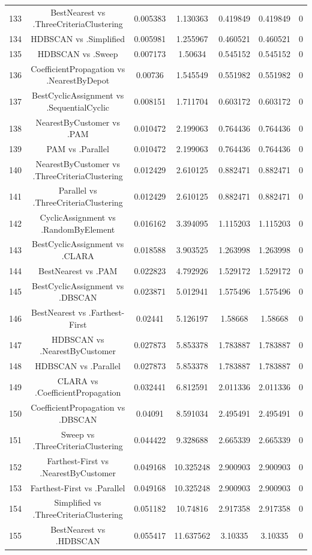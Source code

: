 \documentclass[a4paper,10pt]{article}
\begin{document}
\begin{landscape}
\begin{table}[!htp]
\begin{tabular}{ccccccc}
133&BestNearest vs .ThreeCriteriaClustering&0.005383&1.130363&0.419849&0.419849&0\\
134&HDBSCAN vs .Simplified&0.005981&1.255967&0.460521&0.460521&0\\
135&HDBSCAN vs .Sweep&0.007173&1.50634&0.545152&0.545152&0\\
136&CoefficientPropagation vs .NearestByDepot&0.00736&1.545549&0.551982&0.551982&0\\
137&BestCyclicAssignment vs .SequentialCyclic&0.008151&1.711704&0.603172&0.603172&0\\
138&NearestByCustomer vs .PAM&0.010472&2.199063&0.764436&0.764436&0\\
139&PAM vs .Parallel&0.010472&2.199063&0.764436&0.764436&0\\
140&NearestByCustomer vs .ThreeCriteriaClustering&0.012429&2.610125&0.882471&0.882471&0\\
141&Parallel vs .ThreeCriteriaClustering&0.012429&2.610125&0.882471&0.882471&0\\
142&CyclicAssignment vs .RandomByElement&0.016162&3.394095&1.115203&1.115203&0\\
143&BestCyclicAssignment vs .CLARA&0.018588&3.903525&1.263998&1.263998&0\\
144&BestNearest vs .PAM&0.022823&4.792926&1.529172&1.529172&0\\
145&BestCyclicAssignment vs .DBSCAN&0.023871&5.012941&1.575496&1.575496&0\\
146&BestNearest vs .Farthest-First&0.02441&5.126197&1.58668&1.58668&0\\
147&HDBSCAN vs .NearestByCustomer&0.027873&5.853378&1.783887&1.783887&0\\
148&HDBSCAN vs .Parallel&0.027873&5.853378&1.783887&1.783887&0\\
149&CLARA vs .CoefficientPropagation&0.032441&6.812591&2.011336&2.011336&0\\
150&CoefficientPropagation vs .DBSCAN&0.04091&8.591034&2.495491&2.495491&0\\
151&Sweep vs .ThreeCriteriaClustering&0.044422&9.328688&2.665339&2.665339&0\\
152&Farthest-First vs .NearestByCustomer&0.049168&10.325248&2.900903&2.900903&0\\
153&Farthest-First vs .Parallel&0.049168&10.325248&2.900903&2.900903&0\\
154&Simplified vs .ThreeCriteriaClustering&0.051182&10.74816&2.917358&2.917358&0\\
155&BestNearest vs .HDBSCAN&0.055417&11.637562&3.10335&3.10335&0\\

\end{tabular}
\end{table}
\end{landscape}
\end{document}
